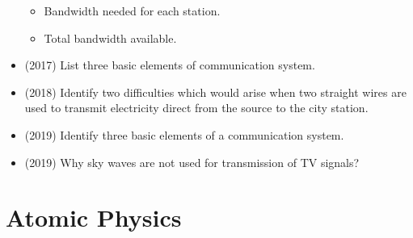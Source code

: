 \documentclass{article}
\begin{document}
\begin{itemize}
\begin{itemize}
\item  Bandwidth needed for each station.
\item  Total bandwidth available. 
\end{itemize}
\item (2017)  List three basic elements of communication system. 
\item (2018)  Identify two difficulties which would arise when two straight wires are used to transmit electricity direct from the source to the city station. 
\item (2019)  Identify three basic elements of a communication system. 
\item (2019)  Why sky waves are not used for transmission of TV signals? 
\end{itemize}


\section{Atomic Physics}
\end{document}
